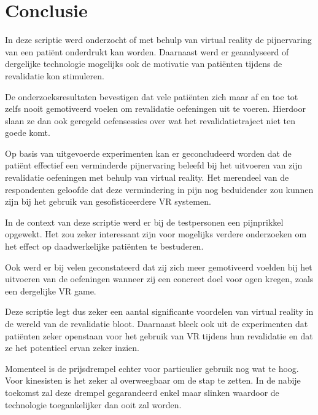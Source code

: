 
\chapter{Conclusie}
\label{ch:conclusie}


In deze scriptie werd onderzocht of met behulp van virtual reality de pijnervaring van een patiënt onderdrukt kan worden. Daarnaast werd er geanalyseerd of dergelijke technologie mogelijks ook de motivatie van patiënten tijdens de revalidatie kon stimuleren.

De onderzoeksresultaten bevestigen dat vele patiënten zich maar af en toe tot zelfs nooit gemotiveerd voelen om revalidatie oefeningen uit te voeren. Hierdoor slaan ze dan ook geregeld oefensessies over wat het revalidatietraject niet ten goede komt.

Op basis van uitgevoerde experimenten kan er geconcludeerd worden dat de patiënt effectief een verminderde pijnervaring beleefd bij het uitvoeren van zijn revalidatie oefeningen met behulp van virtual reality. Het merendeel van de respondenten geloofde dat deze vermindering in pijn nog beduidender zou kunnen zijn bij het gebruik van gesofisticeerdere VR systemen.

In de context van deze scriptie werd er bij de testpersonen een pijnprikkel opgewekt. Het zou zeker interessant zijn voor mogelijks verdere onderzoeken om het effect op daadwerkelijke patiënten te bestuderen.

Ook werd er bij velen geconstateerd dat zij zich meer gemotiveerd voelden bij het uitvoeren van de oefeningen wanneer zij een concreet doel voor ogen kregen, zoals een dergelijke VR game.

Deze scriptie legt dus zeker een aantal significante voordelen van virtual reality in de wereld van de revalidatie bloot. Daarnaast bleek ook uit de experimenten dat patiënten zeker openstaan voor het gebruik van VR tijdens hun revalidatie en dat ze het potentieel ervan zeker inzien.

Momenteel is de prijsdrempel echter voor particulier gebruik nog wat te hoog. Voor kinesisten is het zeker al overweegbaar om de stap te zetten. In de nabije toekomst zal deze drempel gegarandeerd enkel maar slinken waardoor de technologie toegankelijker dan ooit zal worden.

